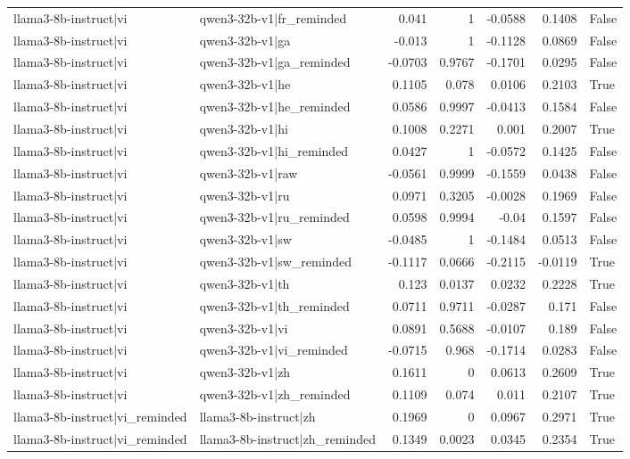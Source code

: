\begin{table}
\begin{tabular}{l l r r r r l}
llama3-8b-instruct|vi & qwen3-32b-v1|fr_reminded & 0.041 & 1 & -0.0588 & 0.1408 & False \\
llama3-8b-instruct|vi & qwen3-32b-v1|ga & -0.013 & 1 & -0.1128 & 0.0869 & False \\
llama3-8b-instruct|vi & qwen3-32b-v1|ga_reminded & -0.0703 & 0.9767 & -0.1701 & 0.0295 & False \\
llama3-8b-instruct|vi & qwen3-32b-v1|he & 0.1105 & 0.078 & 0.0106 & 0.2103 & True \\
llama3-8b-instruct|vi & qwen3-32b-v1|he_reminded & 0.0586 & 0.9997 & -0.0413 & 0.1584 & False \\
llama3-8b-instruct|vi & qwen3-32b-v1|hi & 0.1008 & 0.2271 & 0.001 & 0.2007 & True \\
llama3-8b-instruct|vi & qwen3-32b-v1|hi_reminded & 0.0427 & 1 & -0.0572 & 0.1425 & False \\
llama3-8b-instruct|vi & qwen3-32b-v1|raw & -0.0561 & 0.9999 & -0.1559 & 0.0438 & False \\
llama3-8b-instruct|vi & qwen3-32b-v1|ru & 0.0971 & 0.3205 & -0.0028 & 0.1969 & False \\
llama3-8b-instruct|vi & qwen3-32b-v1|ru_reminded & 0.0598 & 0.9994 & -0.04 & 0.1597 & False \\
llama3-8b-instruct|vi & qwen3-32b-v1|sw & -0.0485 & 1 & -0.1484 & 0.0513 & False \\
llama3-8b-instruct|vi & qwen3-32b-v1|sw_reminded & -0.1117 & 0.0666 & -0.2115 & -0.0119 & True \\
llama3-8b-instruct|vi & qwen3-32b-v1|th & 0.123 & 0.0137 & 0.0232 & 0.2228 & True \\
llama3-8b-instruct|vi & qwen3-32b-v1|th_reminded & 0.0711 & 0.9711 & -0.0287 & 0.171 & False \\
llama3-8b-instruct|vi & qwen3-32b-v1|vi & 0.0891 & 0.5688 & -0.0107 & 0.189 & False \\
llama3-8b-instruct|vi & qwen3-32b-v1|vi_reminded & -0.0715 & 0.968 & -0.1714 & 0.0283 & False \\
llama3-8b-instruct|vi & qwen3-32b-v1|zh & 0.1611 & 0 & 0.0613 & 0.2609 & True \\
llama3-8b-instruct|vi & qwen3-32b-v1|zh_reminded & 0.1109 & 0.074 & 0.011 & 0.2107 & True \\
llama3-8b-instruct|vi_reminded & llama3-8b-instruct|zh & 0.1969 & 0 & 0.0967 & 0.2971 & True \\
llama3-8b-instruct|vi_reminded & llama3-8b-instruct|zh_reminded & 0.1349 & 0.0023 & 0.0345 & 0.2354 & True \\

\end{tabular}
\end{table}
